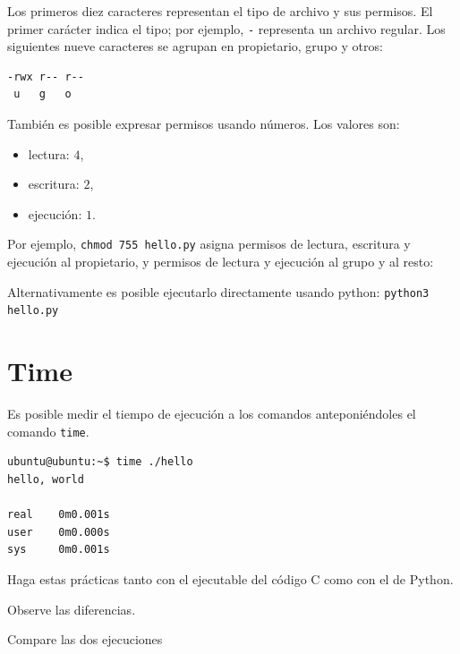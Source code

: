 \documentclass[11pt,a4paper]{article}
\newcommand{\inputcode}[2][]{%
  \par\noindent\begin{minipage}{\linewidth}
    
  \end{minipage}\par}
\begin{document}
\inputcode[language=bash]{../examples/tp1/hello/permissions-symbolic.session}

Los primeros diez caracteres representan el tipo de archivo y sus permisos. El primer carácter indica el tipo; por ejemplo, \texttt{-} representa un archivo regular. Los siguientes nueve caracteres se agrupan en propietario, grupo y otros:

\begin{lstlisting}[language=bash]
-rwx r-- r--
 u   g   o
\end{lstlisting}

También es posible expresar permisos usando números. Los valores son:

\begin{itemize}[nosep]
  \item lectura: $4$,
  \item escritura: $2$,
  \item ejecución: $1$.
\end{itemize}

Por ejemplo, \texttt{chmod 755 hello.py} asigna permisos de lectura, escritura y ejecución al propietario, y permisos de lectura y ejecución al grupo y al resto:

\inputcode[language=bash]{../examples/tp1/hello/permissions-numeric.session}

Alternativamente es posible ejecutarlo directamente usando python: \lstinline!python3 hello.py!

\section{Time}

Es posible medir el tiempo de ejecución a los comandos anteponiéndoles el comando \lstinline!time!.

\begin{lstlisting}[language=bash]
ubuntu@ubuntu:~$ time ./hello
hello, world

real    0m0.001s
user    0m0.000s
sys     0m0.001s
\end{lstlisting}

\begin{extrabox}
Haga estas prácticas tanto con el ejecutable del código C como con el de Python.

Observe las diferencias.

Compare las dos ejecuciones
\end{extrabox}
\end{document}
